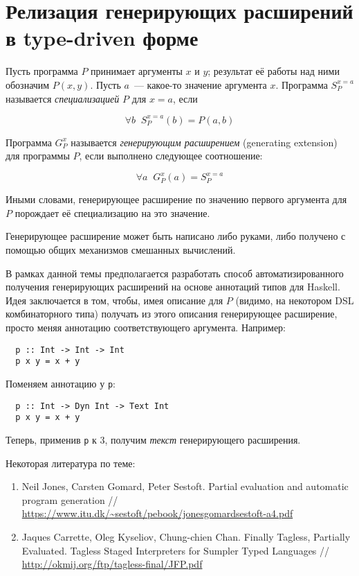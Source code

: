 \documentclass{article}
\begin{document}
\section{Релизация генерирующих расширений в type-driven форме}

Пусть программа $P$ принимает аргументы $x$ и $y$; результат её работы над ними
обозначим $P(x, y)$. Пусть $a$~--- какое-то значение аргумента $x$. Программа
$S^{x=a}_P$ называется \emph{специализацией} $P$ для $x=a$, если

$$
\forall b \;\; S^{x=a}_P(b)=P(a, b)
$$

Программа $G^x_P$ называется \emph{генерирующим расширением} (generating extension) для
программы $P$, если выполнено следующее соотношение:

$$
\forall a \;\; G^x_P(a)=S^{x=a}_P
$$

Иными словами, генерирующее расширение по значению первого аргумента для $P$ порождает
её специализацию на это значение. 

Генерирующее расширение может быть написано либо руками, либо получено с помощью общих
механизмов смешанных вычислений.

В рамках данной темы предполагается разработать способ автоматизированного получения
генерирующих расширений на основе аннотаций типов для Haskell. Идея заключается в том, чтобы,
имея описание для $P$ (видимо, на некотором DSL комбинаторного типа) получать из этого описания
генерирующее расширение, просто меняя аннотацию соответствующего аргумента. Например:

\begin{verbatim}
  p :: Int -> Int -> Int
  p x y = x + y
\end{verbatim}

Поменяем аннотацию у \verb|p|:

\begin{verbatim}
  p :: Int -> Dyn Int -> Text Int
  p x y = x + y
\end{verbatim}

Теперь, применив \verb|p| к 3, получим \emph{текст} генерирующего расширения.

Некоторая литература по теме:

\begin{enumerate}
\item Neil Jones, Carsten Gomard, Peter Sestoft. Partial evaluation and automatic program generation // \url{https://www.itu.dk/~sestoft/pebook/jonesgomardsestoft-a4.pdf}
\item Jaques Carrette, Oleg Kyseliov, Chung-chien Chan. Finally Tagless, Partially Evaluated. Tagless Staged Interpreters for Sumpler Typed Languages // \url{http://okmij.org/ftp/tagless-final/JFP.pdf}
\end{enumerate}
\end{document}

